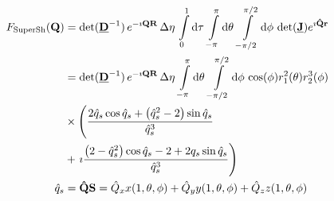 \begin{align}\label{eq:FTsupershapes}
  F_\mathrm{SuperSh}({\bf Q}) &=
\det({\underline{\bf D}}^{-1})\, e^{-\imath{\bf QR}}\, \Delta\eta\, \int\limits_{0}^1
\mathrm{d}\tau\, \int\limits_{-\pi}^{\pi} \mathrm{d}\theta\,  \int\limits_{-\pi/2}^{\pi/2} \mathrm{d}\phi \,
\det({\underline{\bf J}})e^{\imath{\bf\hat{Q}r}} \\
&= \det({\underline{\bf D}}^{-1})\, e^{-\imath{\bf QR}}\, \Delta\eta\, \int\limits_{-\pi}^{\pi} \mathrm{d}\theta\,  \int\limits_{-\pi/2}^{\pi/2} \mathrm{d}\phi \,
\cos (\phi ) r_1^2(\theta) r_2^3(\phi)  \\
&\times     \left( \frac{2\hat{q}_s\cos \hat{q}_s + \left(\hat{q}_s^2-2\right)\sin \hat{q}_s}{\hat{q}_s^3} \right.
    \nonumber \\
   & + \left. \imath \frac{\left(2 - \hat{q}_s^2\right)\cos \hat{q}_s-2 + 2q_s\sin \hat{q}_s}{\hat{q}_s^3}  \right) \nonumber \\
\hat{q}_s &= {\bf\hat{Q}}{\bf S}=\hat{Q}_x x(1,\theta,\phi)+\hat{Q}_y y(1,\theta,\phi)+\hat{Q}_z z(1,\theta,\phi)
\end{align}
\clearpage
